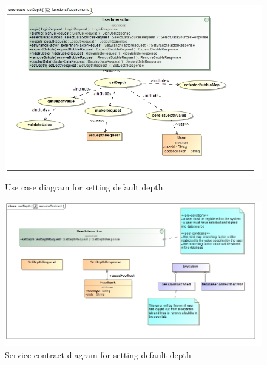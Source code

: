 \documentclass[hidelinks,english]{article}
\begin{document}
    			\begin{figure}[!h]
    			\includegraphics[width=\linewidth]{functionalRequirementsSetDepth.jpg}
    			\caption{Use case diagram for setting default depth}
    			\label{UseCaseSetDepth}
    			\end{figure}
    			
    			\begin{figure}[!h]
    			\includegraphics[width=\linewidth]{serviceContractSetDepth.jpg}
    			\caption{Service contract diagram for setting default depth}
    			\label{ServiceContractSetDepth}
    			\end{figure}
    			
\end{document}
